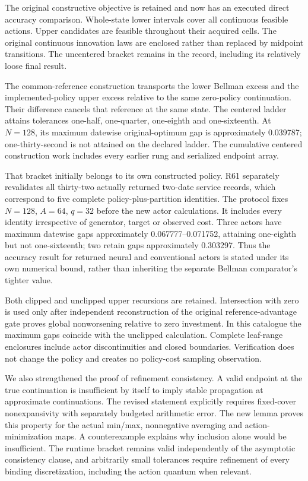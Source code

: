 \documentclass[ecta,nameyear,draft]{econsocart}
\begin{document}
The original constructive objective is retained and now has an executed
direct accuracy comparison. Whole-state lower intervals cover all
continuous feasible actions. Upper candidates are feasible throughout
their acquired cells. The original continuous innovation laws are
enclosed rather than replaced by midpoint transitions. The uncentered
bracket remains in the record, including its relatively loose final
result.

The common-reference construction transports the lower Bellman excess
and the implemented-policy upper excess relative to the same zero-policy
continuation. Their difference cancels that reference at the same state.
The centered ladder attains tolerances one-half, one-quarter, one-eighth
and one-sixteenth. At \(N=128\), its maximum datewise original-optimum
gap is approximately 0.039787; one-thirty-second is not attained on the
declared ladder. The cumulative centered construction work includes
every earlier rung and serialized endpoint array.

That bracket initially belongs to its own constructed policy. R61
separately revalidates all thirty-two actually returned two-date service
records, which correspond to five complete policy-plus-partition
identities. The protocol fixes \(N=128\), \(A=64\), \(q=32\) before the
new actor calculations. It includes every identity irrespective of
generator, target or observed cost. Three actors have maximum datewise
gaps approximately 0.067777--0.071752, attaining one-eighth but not
one-sixteenth; two retain gaps approximately 0.303297. Thus the accuracy
result for returned neural and conventional actors is stated under its
own numerical bound, rather than inheriting the separate Bellman
comparator's tighter value.

Both clipped and unclipped upper recursions are retained. Intersection
with zero is used only after independent reconstruction of the original
reference-advantage gate proves global nonworsening relative to zero
investment. In this catalogue the maximum gaps coincide with the
unclipped calculation. Complete leaf-range enclosures include actor
discontinuities and closed boundaries. Verification does not change the
policy and creates no policy-cost sampling observation.

We also strengthened the proof of refinement consistency. A valid
endpoint at the true continuation is insufficient by itself to imply
stable propagation at approximate continuations. The revised statement
explicitly requires fixed-cover nonexpansivity with separately budgeted
arithmetic error. The new lemma proves this property for the actual
min/max, nonnegative averaging and action-minimization maps. A
counterexample explains why inclusion alone would be insufficient. The
runtime bracket remains valid independently of the asymptotic
consistency clause, and arbitrarily small tolerances require refinement
of every binding discretization, including the action quantum when
relevant.
\end{document}
